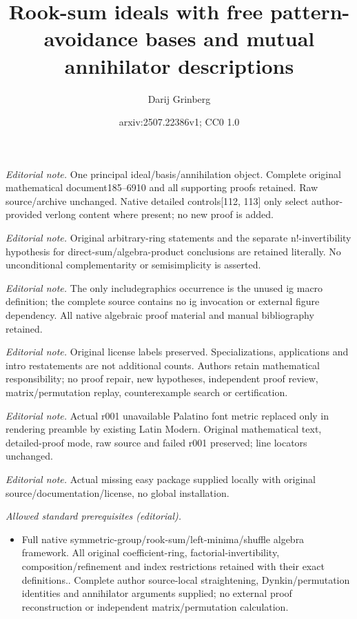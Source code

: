 \documentclass[numbers=enddot,12pt,final,onecolumn,notitlepage]{scrartcl}%
\title{Rook-sum ideals with free pattern-avoidance bases and mutual annihilator descriptions}
\author{Darij Grinberg}
\date{arxiv:2507.22386v1; CC0 1.0}
\numberwithin{exer}{subsection}
\theoremstyle{definition}
\begin{document}
\maketitle
\noindent\textit{Editorial note.} One principal ideal/basis/annihilation object. Complete original mathematical document185--6910 and all supporting proofs retained. Raw source/archive unchanged. Native detailed controls[112, 113] only select author-provided verlong content where present; no new proof is added.\par\medskip
\noindent\textit{Editorial note.} Original arbitrary-ring statements and the separate n!-invertibility hypothesis for direct-sum/algebra-product conclusions are retained literally. No unconditional complementarity or semisimplicity is asserted.\par\medskip
\noindent\textit{Editorial note.} The only includegraphics occurrence is the unused ig macro definition; the complete source contains no ig invocation or external figure dependency. All native algebraic proof material and manual bibliography retained.\par\medskip
\noindent\textit{Editorial note.} Original license labels preserved. Specializations, applications and intro restatements are not additional counts. Authors retain mathematical responsibility; no proof repair, new hypotheses, independent proof review, matrix/permutation replay, counterexample search or certification.\par\medskip
\noindent\textit{Editorial note.} Actual r001 unavailable Palatino font metric replaced only in rendering preamble by existing Latin Modern. Original mathematical text, detailed-proof mode, raw source and failed r001 preserved; line locators unchanged.\par\medskip
\noindent\textit{Editorial note.}  Actual missing easy package supplied locally with original source/documentation/license, no global installation.\par\medskip
\noindent\textit{Allowed standard prerequisites (editorial).}\begin{itemize}
\item Full native symmetric-group/rook-sum/left-minima/shuffle algebra framework. All original coefficient-ring, factorial-invertibility, composition/refinement and index restrictions retained with their exact definitions.. Complete author source-local straightening, Dynkin/permutation identities and annihilator arguments supplied; no external proof reconstruction or independent matrix/permutation calculation.
\end{itemize}\medskip
\end{document}
